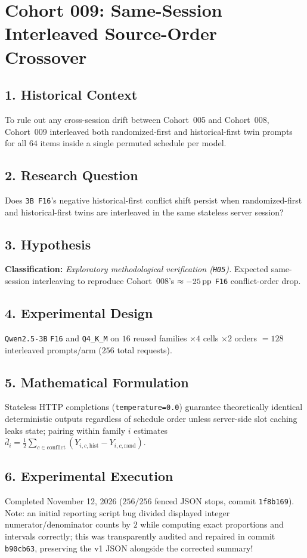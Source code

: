 \section{Cohort 009: Same-Session Interleaved Source-Order Crossover}

\subsection*{1. Historical Context}
To rule out any cross-session drift between Cohort~005 and Cohort~008, Cohort~009 interleaved both randomized-first and historical-first twin prompts for all $64$ items inside a single permuted schedule per model.

\subsection*{2. Research Question}
Does \texttt{3B F16}'s negative historical-first conflict shift persist when randomized-first and historical-first twins are interleaved in the same stateless server session?

\subsection*{3. Hypothesis}
\textbf{Classification:} \emph{Exploratory methodological verification (\texttt{H05}).} Expected same-session interleaving to reproduce Cohort~008's $\approx -25\,\mathrm{pp}$ \texttt{F16} conflict-order drop.

\subsection*{4. Experimental Design}
\texttt{Qwen2.5-3B} \texttt{F16} and \texttt{Q4\_K\_M} on $16$ reused families $\times 4$ cells $\times 2$ orders $= 128$ interleaved prompts/arm ($256$ total requests).

\subsection*{5. Mathematical Formulation}
Stateless HTTP completions (\texttt{temperature=0.0}) guarantee theoretically identical deterministic outputs regardless of schedule order unless server-side slot caching leaks state; pairing within family $i$ estimates $\bar{d}_i = \frac{1}{2}\sum_{c \in \mathrm{conflict}}(Y_{i,c,\mathrm{hist}} - Y_{i,c,\mathrm{rand}})$.

\subsection*{6. Experimental Execution}
Completed November 12, 2026 ($256/256$ fenced JSON stops, commit \texttt{1f8b169}). Note: an initial reporting script bug divided displayed integer numerator/denominator counts by $2$ while computing exact proportions and intervals correctly; this was transparently audited and repaired in commit \texttt{b90cb63}, preserving the v1 JSON alongside the corrected summary!

